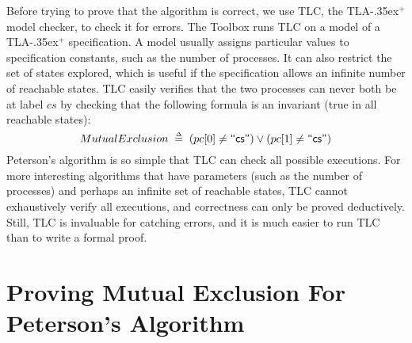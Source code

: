 \documentclass[a4paper,draft]{llncs}
\newcommand{\tlaplus}{\mbox{TLA\kern -.35ex$^+$}\xspace}
\newcommand{\tlastring}[1]{\textsf{``#1''}}
\begin{document}
Before trying to prove that the algorithm is correct, we use TLC,
the \tlaplus model checker, to check it for errors.
%
The Toolbox runs TLC on a model of a \tlaplus specification.  A model
usually assigns particular values to specification constants, such as
the number of processes. It can also restrict the set of states
explored, which is useful if the specification allows an infinite number
of reachable states.
%
TLC easily verifies that the two processes can never 
both be at label $cs$ by checking that the following formula is
an invariant (true in all reachable states):
% 
%
\[
  MutualExclusion \defeq 
  (pc[0] \neq \tlastring{cs}) \lor (pc[1] \neq \tlastring{cs})
\]
% 
Peterson's
algorithm is so simple that TLC can check all possible
executions. For more interesting algorithms that have parameters (such as
the number of processes) and perhaps
an infinite set of reachable states, TLC cannot exhaustively
verify all executions, and correctness can only be proved deductively. Still, TLC is
invaluable for catching errors, and
it is much easier to run TLC than to write a
formal proof.



\section{Proving Mutual Exclusion For Peterson's Algorithm}
\label{sec:proving}
\end{document}
